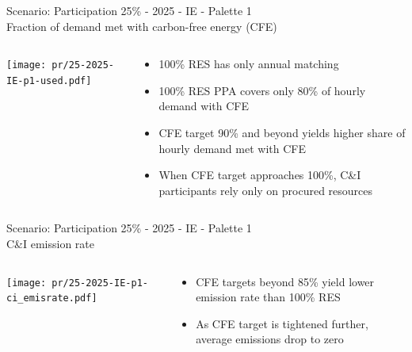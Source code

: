 \begin{frame}{Scenario: Participation 25\% - 2025 - IE - Palette 1 
\\ Fraction of demand met with carbon-free energy (CFE)}
\begin{columns}[T]
\begin{column}{9cm}
\centering

\texttt{[image: pr/25-2025-IE-p1-used.pdf]}
\end{column}
\begin{column}{5cm}

  \begin{itemize}
  \item 100\% RES has only \alert{annual matching}
  \item 100\% RES PPA covers \alert{only 80\%} of hourly demand with CFE
  \item CFE target \alert{90\%} and beyond yields higher share of hourly demand met with CFE
  \item When CFE target approaches 100\%, C\&I participants rely \alert{only on procured resources}
  \end{itemize}
  
\end{column}
\end{columns}

\end{frame}



\begin{frame}{Scenario: Participation 25\% - 2025 - IE - Palette 1
\\ C\&I emission rate}

\begin{columns}[T]
\begin{column}{9cm}
\centering

\texttt{[image: pr/25-2025-IE-p1-ci\_emisrate.pdf]}
\end{column}
\begin{column}{5cm}

  \vspace{.5cm}

  \begin{itemize}
  \item CFE targets beyond \alert{85\%} yield lower emission rate than 100\% RES 
  \item As CFE target is tightened further, average emissions \alert{drop to zero}
  \end{itemize}
\end{column}
\end{columns}

\end{frame}



